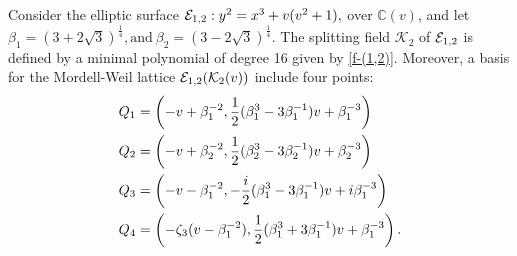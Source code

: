 \documentclass[11pt]{amsart}
\begin{document}
	\begin{thm}
		\label{main6}
 Consider the  elliptic surface  	$ {\mathcal E}_{1, 2}: y^2 = x^3 + v(v^2 + 1), $
over  $\mathbb{C}(v)$, and let $\beta_1= (3+2\sqrt{3})^{\frac{1}{4}},  \text{and} \ \beta_2=(3-2\sqrt{3})^{\frac{1}{4}}. $
The splitting field $\mathcal{K}_2$ of ${\mathcal E}_{1, 2}$  is    defined by a minimal polynomial of degree 16 given by \ref{f-(1,2)}.
	Moreover, a basis for the Mordell-Weil lattice  $ {\mathcal E}_{1,2}({\mathcal K}_2(v))$  include four points:
	\begin{align}
	Q_1 &= \left( -v + \beta_1^{-2},   \frac{1}{2}(\beta_1^3 - 3\beta_1^{-1})v + \beta_1^{-3} \right) \notag \\
	Q_2 &= \left( -v + \beta_2^{-2},   \frac{1}{2}(\beta_2^3 - 3\beta_2^{-1})v + \beta_2^{-3} \right) \notag \\
		Q_3 &= \left( -v - \beta_1^{-2},  -\frac{i}{2}(\beta_1^3 - 3\beta_1^{-1})v + i\beta_1^{-3} \right)\notag  \\
	Q_4 &= \left( -\zeta_3 (v-\beta_1^{-2}),  \frac{1}{2}( \beta_1^3 + 3\beta_1^{-1})v +\beta_1^{-3} \right). \label{Q-(1,2)}
\end{align}

\end{thm}

	 	
\end{document}
